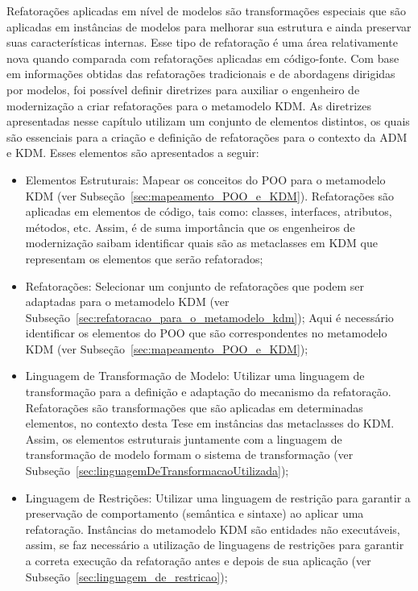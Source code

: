Refatorações aplicadas em nível de modelos são transformações especiais que são aplicadas em instâncias de modelos para melhorar sua estrutura e ainda preservar suas características internas. Esse tipo de refatoração é uma área relativamente nova quando comparada com refatorações aplicadas em código-fonte. Com base em informações obtidas das refatorações tradicionais e de abordagens dirigidas por modelos, foi possível definir diretrizes para auxiliar o engenheiro de modernização a criar refatorações para o metamodelo KDM. As diretrizes apresentadas nesse capítulo utilizam um conjunto de elementos distintos, os quais são essenciais para a criação e definição de refatorações para o contexto da ADM e KDM. Esses elementos são apresentados a seguir:

\begin{itemize}
\item Elementos Estruturais: Mapear os conceitos do POO para o metamodelo KDM (ver Subseção~\ref{sec:mapeamento_POO_e_KDM}). Refatorações são aplicadas em elementos de código, tais como: classes, interfaces, atributos, métodos, etc. Assim, é de suma importância que os engenheiros de modernização saibam identificar quais são as metaclasses em KDM que representam os elementos que serão refatorados;

\item Refatorações: Selecionar um conjunto de refatorações que podem ser adaptadas para o metamodelo KDM (ver Subseção~\ref{sec:refatoracao_para_o_metamodelo_kdm});
Aqui é necessário identificar os elementos do POO que são correspondentes no metamodelo KDM (ver Subseção~\ref{sec:mapeamento_POO_e_KDM});

\item Linguagem de Transformação de Modelo: Utilizar uma linguagem de transformação para a definição e adaptação do mecanismo da refatoração. Refatorações são transformações que são aplicadas em determinadas elementos, no contexto desta Tese em instâncias das metaclasses do KDM. Assim, os elementos estruturais juntamente com a linguagem de transformação de modelo formam o sistema de transformação (ver Subseção~\ref{sec:linguagemDeTransformacaoUtilizada});

\item Linguagem de Restrições: Utilizar uma linguagem de restrição para garantir a preservação de comportamento (semântica e sintaxe) ao aplicar uma refatoração. Instâncias do metamodelo KDM são entidades não executáveis, assim, se faz necessário a utilização de linguagens de restrições para garantir a correta execução da refatoração antes e depois de sua aplicação (ver Subseção~\ref{sec:linguagem_de_restricao});


\end{itemize}
